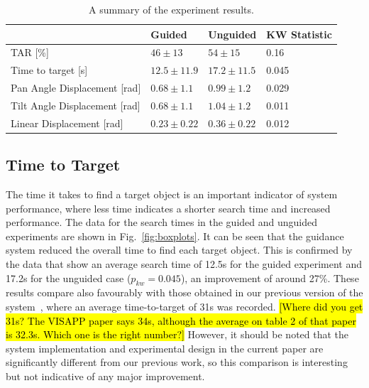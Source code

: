\documentclass[runningheads]{llncs}
\DeclareRobustCommand{\tofix}[1]{{\sethlcolor{yellow}\hl{[#1]}}}
\begin{document}
\begin{table}
  \centering
  \caption{A summary of the experiment results. }\label{tab:results}
  \begin{tabular}{p{5cm}p{2cm}p{2cm}p{2.5cm}}
    \toprule
    & \textbf{Guided}             & \textbf{Unguided} & \textbf{KW Statistic} \\\midrule
    TAR [\%]                      & $46\pm13$         & $54\pm15$     &  0.16 \\\midrule
    Time to target [s]            & $12.5\pm11.9$     & $17.2\pm11.5$ & 0.045 \\\midrule
    Pan Angle Displacement [rad]  & $0.68\pm1.1$      & $0.99\pm1.2$  & 0.029 \\\midrule
    Tilt Angle Displacement [rad] & $0.68\pm1.1$      & $1.04\pm1.2$  & 0.011 \\\midrule
    Linear Displacement [rad]     & $0.23\pm0.22$     & $0.36\pm0.22$ & 0.012 \\\midrule
    \bottomrule
  \end{tabular}
\end{table}

\subsection{Time to Target}

The time it takes to find a target object is an important indicator of system performance, where less time indicates a shorter search time and increased performance.
The data for the search times in the guided and unguided experiments are shown in Fig.~\ref{fig:boxplots}.
%
It can be seen that the guidance system reduced the overall time to find each target object.
This is confirmed by the data that show an average search time of 12.5s for the guided experiment and 17.2s for the unguided case ($p_{kw}=0.045$), an improvement of around 27\%.
These results compare also favourably with those obtained in our previous version of the system~\cite{lock2019active}, where an average time-to-target of 31s was recorded. \tofix{Where did you get 31s? The VISAPP paper says 34s, although the average on table 2 of that paper is 32.3s. Which one is the right number?}
However, it should be noted that the system implementation and experimental design in the current paper are significantly different from our previous work, so this comparison is interesting but not indicative of any major improvement.
\end{document}
